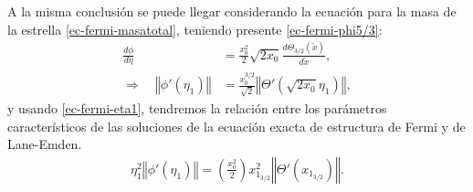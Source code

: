 A la misma conclusión se puede llegar considerando la ecuación para la masa de la estrella \eqref{ec-fermi-masatotal}, teniendo presente \eqref{ec-fermi-phi5/3}:
\begin{align}
\frac{d\phi}{d\eta}&=\frac{x_0^2}{2}\sqrt{2x_0}\frac{d\Theta_{3/2}(\widetilde{x})}{d\widetilde{x}},\\
\Rightarrow\quad \left\Vert\phi'(\eta_1)\right\Vert&=\frac{x_0^{3/2}}{\sqrt{2}}\left\Vert\Theta'(\sqrt{2x_0}\eta_1)\right\Vert,
\end{align}
y usando \eqref{ec-fermi-eta1}, tendremos la relación entre los parámetros característicos de las soluciones de la ecuación exacta de estructura de Fermi y de Lane-Emden.
\begin{align}
 \eta_1^2\left\Vert\phi'(\eta_1)\right\Vert=\left(\frac{x_0^2}{2}\right)x_{1_{3/2}}^2\left\Vert\Theta'(x_{1_{3/2}})\right\Vert.
\end{align}




